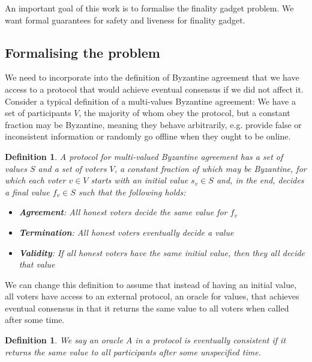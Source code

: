 \documentclass{article}
\newtheorem{definition}[theorem]{Definition}
\begin{document}
An important goal of this work is to formalise the finality gadget problem. We want formal guarantees for safety and liveness for finality gadget.

\subsection{Formalising the problem}

We need to incorporate into the definition of Byzantine agreement that we have access to a protocol that would achieve eventual consensus if we did not affect it.
Consider a typical definition of a multi-values Byzantine agreement: 
We have a set of participants $V$, the majority of whom obey the protocol, but a constant fraction may be Byzantine, meaning they behave arbitrarily, e.g. provide false or inconsistent information or randomly go offline when they ought to be online.

\begin{definition} A protocol for {\em multi-valued Byzantine agreement} has a set of values $S$ and a set of voters $V$, a constant fraction of which may be Byzantine, for which each voter $v \in V$ starts with an initial value $s_v \in S$ and, in the end, decides a final value $f_v \in S$ such that the following holds:

\begin{itemize}
\item {\bf Agreement}: All honest voters decide the same value for $f_v$
\item {\bf Termination}: All honest voters eventually decide a value
\item {\bf Validity}: If all honest voters have the same initial value, then they all decide that value
\end{itemize}

\end{definition}

We can change this definition to assume that instead of having an initial value, all voters have access to an external protocol, an oracle for values, that achieves eventual consensus in that it returns the same value to all voters when called after some time.

\begin{definition}
We say an oracle $A$ in a protocol is {\em eventually consistent} if it returns the same value to all participants after some unspecified time.
\end{definition}
\end{document}
